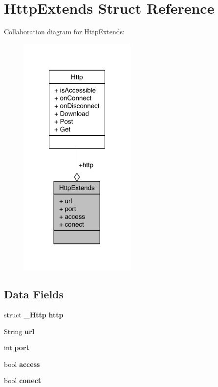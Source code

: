 \section{Http\-Extends Struct Reference}
\label{structHttpExtends}


Collaboration diagram for Http\-Extends\-:\nopagebreak
\begin{figure}[H]
\begin{center}
\leavevmode
\includegraphics[width=164pt]{structHttpExtends__coll__graph}
\end{center}
\end{figure}
\subsection*{Data Fields}
\begin{DoxyCompactItemize}
\item 
struct {\bf \-\_\-\-Http} {\bfseries http}\label{structHttpExtends_a81ed6e5d7c729ff3268024a1c2c2df8a}

\item 
String {\bfseries url}\label{structHttpExtends_a1588ec92036f65666c42379bc9e3d79b}

\item 
int {\bfseries port}\label{structHttpExtends_ad2748bfb9d2a6b28a966d9c6af698a59}

\item 
bool {\bfseries access}\label{structHttpExtends_afbd8700afd5bb3eb484255dc14e83812}

\item 
bool {\bfseries conect}\label{structHttpExtends_ae6c4a0fd15e6df1eaa00d21d5a196d78}

\end{DoxyCompactItemize}


